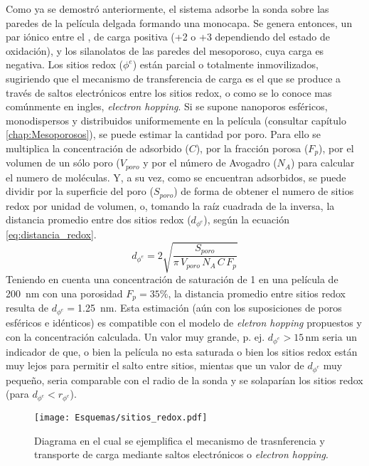 	 Como ya se demostró anteriormente, el sistema adsorbe la sonda sobre las paredes de la película delgada formando una monocapa. Se genera entonces, un par iónico entre el \ru, de carga positiva (+2 o +3 dependiendo del estado de oxidación), y los silanolatos de las paredes del mesoporoso, cuya carga es negativa. Los sitios redox ($\phi^{e}$) están parcial o totalmente inmovilizados, sugiriendo que el mecanismo de transferencia de carga es el que se produce a través de saltos electrónicos entre los sitios redox, o como se lo conoce mas comúnmente en ingles, \textit{electron hopping}. %
	 Si se supone nanoporos esféricos, monodispersos y distribuidos uniformemente en la película (consultar capítulo \ref{chap:Mesoporosos}), se puede estimar la cantidad \ru\space por poro. Para ello se multiplica la concentración de \ru\space adsorbido ($C$), por la fracción porosa ($F_p$), por el volumen de un sólo poro ($V_{poro}$ y por el número de Avogadro ($N_{A}$) para calcular el numero de moléculas. Y, a su vez, como se encuentran adsorbidos, se puede dividir por la superficie del poro ($S_{poro}$) de forma de obtener el numero de sitios redox por unidad de volumen, o, tomando la raíz cuadrada de la inversa, la distancia promedio entre dos sitios redox ($d_{\phi^{e}}$), según la ecuación \ref{eq:distancia_redox}. 
	 	\begin{equation}
					d_{\phi^{e}}=2\sqrt{\frac{S_{poro}}{\pi\, V_{poro}\, N_A\, C\, F_p}}
					\label{eq:distancia_redox}
			\end{equation}
	 Teniendo en cuenta una concentración de saturación de \SI{1}{\Molar} en una película de \SI{200}{nm} con una porosidad $F_p=35\%$, la distancia promedio entre sitios redox resulta de $d_{\phi^{e}}=$\SI{1.25}{nm}. Esta estimación (aún con los suposiciones de poros esféricos e idénticos) es compatible con el modelo de \textit{eletron hopping} propuestos y con la concentración calculada. Un valor muy grande, p. ej. $d_{\phi^{e}}>15\, \text{nm}$ seria un indicador de que, o bien la película no esta saturada o bien los sitios redox están muy lejos para permitir el salto entre sitios, mientas que un valor de $d_{\phi^{e}}$ muy pequeño, seria comparable con el radio de la sonda y se solaparían los sitios redox (para $d_{\phi^{e}} < r_{\phi^{e}}$). 
	 		\begin{figure}[ht!]
					\centering
			 	    \texttt{[image: Esquemas/sitios\_redox.pdf]}
			        \caption[Mecanismo de transferencia de electrones]{Diagrama en el cual se ejemplifica el mecanismo de trasnferencia y transporte de carga mediante saltos electrónicos o \textit{electron hopping}.}
			        \label{fig:sitios_redox}
			      	\end{figure} 	
	

